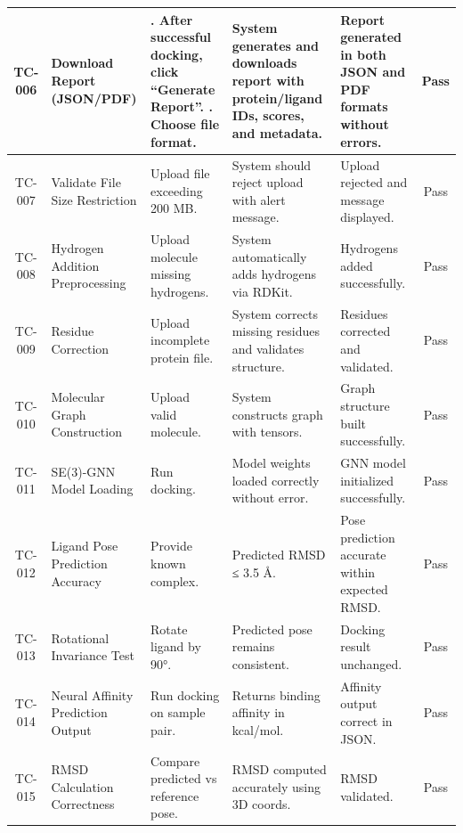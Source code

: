 \documentclass[12pt,a4]{report}
\begin{document}
\begin{center}
\begin{tabularx}{\textwidth}{|c|>{\RaggedRight\arraybackslash}X|>{\RaggedRight\arraybackslash}X|>{\RaggedRight\arraybackslash}X|>{\RaggedRight\arraybackslash}X|c|}
TC-006 & Download Report (JSON/PDF) &
1. After successful docking, click “Generate Report”. \newline
2. Choose file format. &
System generates and downloads report with protein/ligand IDs, scores, and metadata. &
Report generated in both JSON and PDF formats without errors. &
Pass \\ \hline

TC-007 & Validate File Size Restriction &
Upload file exceeding 200 MB. &
System should reject upload with alert message. &
Upload rejected and message displayed. &
Pass \\ \hline

TC-008 & Hydrogen Addition Preprocessing &
Upload molecule missing hydrogens. &
System automatically adds hydrogens via RDKit. &
Hydrogens added successfully. &
Pass \\ \hline

TC-009 & Residue Correction &
Upload incomplete protein file. &
System corrects missing residues and validates structure. &
Residues corrected and validated. &
Pass \\ \hline

TC-010 & Molecular Graph Construction &
Upload valid molecule. &
System constructs graph with tensors. &
Graph structure built successfully. &
Pass \\ \hline

TC-011 & SE(3)-GNN Model Loading &
Run docking. &
Model weights loaded correctly without error. &
GNN model initialized successfully. &
Pass \\ \hline

TC-012 & Ligand Pose Prediction Accuracy &
Provide known complex. &
Predicted RMSD ≤ 3.5 Å. &
Pose prediction accurate within expected RMSD. &
Pass \\ \hline

TC-013 & Rotational Invariance Test &
Rotate ligand by 90°. &
Predicted pose remains consistent. &
Docking result unchanged. &
Pass \\ \hline

TC-014 & Neural Affinity Prediction Output &
Run docking on sample pair. &
Returns binding affinity in kcal/mol. &
Affinity output correct in JSON. &
Pass \\ \hline

TC-015 & RMSD Calculation Correctness &
Compare predicted vs reference pose. &
RMSD computed accurately using 3D coords. &
RMSD validated. &
Pass \\ \hline


\end{tabularx}
\end{center}
\end{document}
